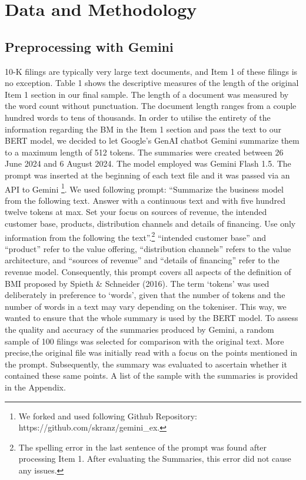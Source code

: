\documentclass[
]{article}
\begin{document}
\newpage{}

\section{Data and Methodology}\label{data-and-methodology}

\subsection{Preprocessing with Gemini}\label{preprocessing-with-gemini}

10-K filings are typically very large text documents, and Item 1 of
these filings is no exception. Table 1 shows the descriptive measures of
the length of the original Item 1 section in our final sample. The
length of a document was measured by the word count without punctuation.
The document length ranges from a couple hundred words to tens of
thousands. In order to utilise the entirety of the information regarding
the BM in the Item 1 section and pass the text to our BERT model, we
decided to let Google's GenAI chatbot Gemini summarize them to a maximum
length of 512 tokens. The summaries were created between 26 June 2024
and 6 August 2024. The model employed was Gemini Flash 1.5. The prompt
was inserted at the beginning of each text file and it was passed via an
API to Gemini \footnote{We forked and used following Github Repository:
  https://github.com/skranz/gemini\_ex.}. We used following prompt:
``Summarize the business model from the following text. Answer with a
continuous text and with five hundred twelve tokens at max. Set your
focus on sources of revenue, the intended customer base, products,
distribution channels and details of financing. Use only information
from the following the text''.\footnote{The spelling error in the last
  sentence of the prompt was found after processing Item 1. After
  evaluating the Summaries, this error did not cause any issues.}
``intended customer base'' and ``product'' refer to the value offering,
``distribution channels'' refers to the value architecture, and
``sources of revenue'' and ``details of financing'' refer to the revenue
model. Consequently, this prompt covers all aspects of the definition of
BMI proposed by Spieth \& Schneider (2016). The term `tokens' was used
deliberately in preference to `words', given that the number of tokens
and the number of words in a text may vary depending on the tokeniser.
This way, we wanted to ensure that the whole summary is used by the BERT
model. To assess the quality and accuracy of the summaries produced by
Gemini, a random sample of 100 filings was selected for comparison with
the original text. More precise,the original file was initially read
with a focus on the points mentioned in the prompt. Subsequently, the
summary was evaluated to ascertain whether it contained these same
points. A list of the sample with the summaries is provided in the
Appendix.
\end{document}
